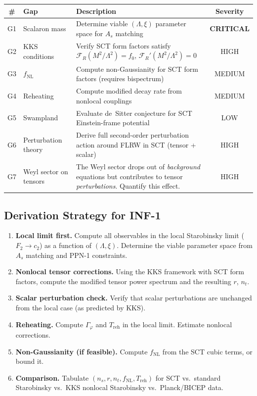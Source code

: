 \documentclass[11pt,a4paper]{article}
\theoremstyle{plain}
\theoremstyle{definition}
\begin{document}
\begin{center}
\renewcommand{\arraystretch}{1.4}
\begin{tabular}{clp{7cm}c}
\toprule
\# & Gap & Description & Severity \\
\midrule
G1 & Scalaron mass & Determine viable $(\Lambda, \xi)$ parameter
  space for $A_s$ matching & \textbf{CRITICAL} \\
G2 & KKS conditions & Verify SCT form factors satisfy
  $\mathcal{F}_R(M^2/\Lambda^2) = f_0$,
  $\mathcal{F}_R'(M^2/\Lambda^2) = 0$ & HIGH \\
G3 & $f_{\mathrm{NL}}$ & Compute non-Gaussianity for SCT form
  factors (requires bispectrum) & MEDIUM \\
G4 & Reheating & Compute modified decay rate from nonlocal
  couplings & MEDIUM \\
G5 & Swampland & Evaluate de~Sitter conjecture for SCT
  Einstein-frame potential & LOW \\
G6 & Perturbation theory & Derive full second-order perturbation
  action around FLRW in SCT (tensor + scalar) & HIGH \\
G7 & Weyl sector on tensors & The Weyl sector drops out of
  \emph{background} equations but contributes to tensor
  \emph{perturbations}. Quantify this effect. & HIGH \\
\bottomrule
\end{tabular}
\end{center}

\subsection{Derivation Strategy for INF-1}

\begin{enumerate}[(1)]
  \item \textbf{Local limit first.}
    Compute all observables in the local Starobinsky limit ($F_2 \to c_2$)
    as a function of $(\Lambda, \xi)$. Determine the viable parameter
    space from $A_s$ matching and PPN-1 constraints.

  \item \textbf{Nonlocal tensor corrections.}
    Using the KKS framework with SCT form factors, compute the modified
    tensor power spectrum and the resulting $r$, $n_t$.

  \item \textbf{Scalar perturbation check.}
    Verify that scalar perturbations are unchanged from the local case
    (as predicted by KKS).

  \item \textbf{Reheating.}
    Compute $\Gamma_\varphi$ and $T_{\mathrm{reh}}$ in the local limit.
    Estimate nonlocal corrections.

  \item \textbf{Non-Gaussianity (if feasible).}
    Compute $f_{\mathrm{NL}}$ from the SCT cubic terms, or bound it.

  \item \textbf{Comparison.}
    Tabulate $(n_s, r, n_t, f_{\mathrm{NL}}, T_{\mathrm{reh}})$
    for SCT vs.\ standard Starobinsky vs.\ KKS nonlocal Starobinsky
    vs.\ Planck/BICEP data.
\end{enumerate}
\end{document}

